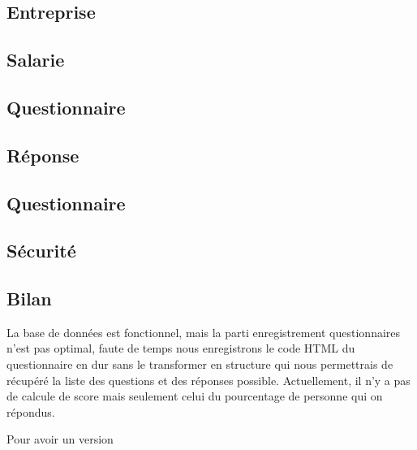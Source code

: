 \subsection{Entreprise}

\subsection{Salarie}

\subsection{Questionnaire}

\subsection{Réponse}

\subsection{Questionnaire}

\subsection{Sécurité}

\subsection{Bilan}

La base de données est fonctionnel, mais la parti enregistrement questionnaires n'est pas optimal, faute de temps nous enregistrons le code HTML du questionnaire en dur sans le transformer en structure qui nous permettrais de récupéré la liste des questions et des réponses possible. Actuellement, il n'y a pas de calcule de score mais seulement celui du pourcentage de personne qui on répondus.

Pour avoir un version 

